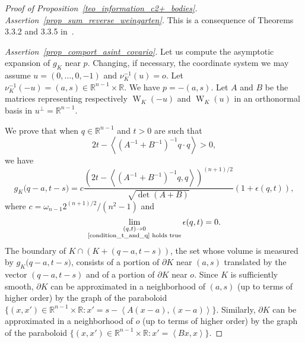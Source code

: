 \documentclass[a4paper]{amsart}
\theoremstyle{definition}
\numberwithin{equation}{section}
\begin{document}
\begin{proof}[Proof of Proposition~\ref{teo_information_c2+_bodies}]

\emph{Assertion~\eqref{prop_sum_reverse_weingarten}.} This is a consequence of Theorems 3.3.2 and 3.3.5 in~\cite{Gar95ed2}.

\emph{Assertion~\eqref{prop_comport_asint_covario}.} Let us compute the  asymptotic expansion of $g_K$ near $p$. Changing, if necessary, the coordinate system we may assume  $u=(0,\dots,0,-1)$ and $\nu_K^{-1}(u)=o$. 
Let $\nu_K^{-1}(-u)=(a,s)\in{\mathbb{R}}^{n-1}\times{\mathbb{R}}$. We have $p=-(a,s)$. Let $A$ and $B$ be the matrices representing respectively ${{\mathop{W}}}_K(-u)$ and ${{\mathop{W}}}_K(u)$ in an orthonormal basis in $u^\perp={\mathbb{R}}^{n-1}$.

We prove that when  $q\in{\mathbb{R}}^{n-1}$ and $t>0$ are such that
\begin{equation}\label{condition_t_and_q}
2t-\left<\left(A^{-1}+B^{-1}\right)^{-1}q\cdot q\right>>0,
\end{equation}
we have
\begin{equation}\label{svil_asintot}
 g_K\big(q-a,t-s\big)=c\frac
{ \left( 2t-\left<\left(A^{-1}+B^{-1}\right)^{-1}q, q\right>\right)^{(n+1)/2}}
{\sqrt{\det(A+B)}}
\left(1+\epsilon(q,t)\right),
\end{equation}
where $c=\omega_{n-1}2^{(n+1)/2}/(n^2-1)$ and
\[
 \lim_{\substack{(q,t)\to0\\ \text{\eqref{condition_t_and_q} holds true}}} \epsilon(q,t)=0.
\]
The boundary of $K\cap (K+(q-a,t-s))$, the set whose volume is measured by $g_K\big(q-a,t-s\big)$, consists of a portion of ${{\partial}} K$ near $(a,s)$ translated by the vector $(q-a,t-s)$ and of a portion of ${{\partial}} K$ near $o$.
Since $K$ is sufficiently smooth, $\partial K$ can be approximated in a neighborhood of $(a,s)$ (up to terms of higher order) by the graph of the paraboloid $\{(x,x')\in{\mathbb{R}}^{n-1}\times{\mathbb{R}} : x'=s-\left<A(x-a),(x-a)\right>\}$.
Similarly, $\partial K$ can be approximated in a neighborhood of $o$ (up to terms of higher order) by the graph of the paraboloid $\{(x,x')\in{\mathbb{R}}^{n-1}\times{\mathbb{R}} : x'=\left<Bx, x\right>\}$.


\end{proof}
\end{document}
